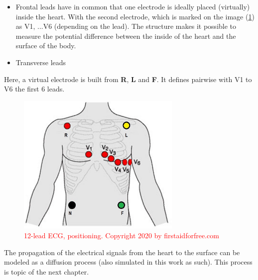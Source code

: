\begin{itemize}
    \item Frontal leads have in common that one electrode is ideally placed (virtually) inside the heart. With the second electrode, which is marked on the image (\ref{fig:12-lead-ecg}) as V1, ...V6 (depending on the lead). The structure makes it possible to measure the potential difference between the inside of the heart and the surface of the body.
    \item Transverse leads
\end{itemize}
Here, a virtual electrode is built from \textbf{R}, \textbf{L} and \textbf{F}. It defines pairwise with V1 to V6 the first 6 leads.

\begin{figure}[ht]
    \center
    \includegraphics[width=0.7\textwidth]{figures/ecg_12_lead.png}
	\caption{\textcolor{red}{12-lead ECG, positioning. Copyright 2020 by firstaidforfree.com}}
	\label{fig:12-lead-ecg}
\end{figure}

The propagation of the electrical signals from the heart to the surface can be modeled as a diffusion process (also simulated in this work as such). This process is topic of the next chapter.




